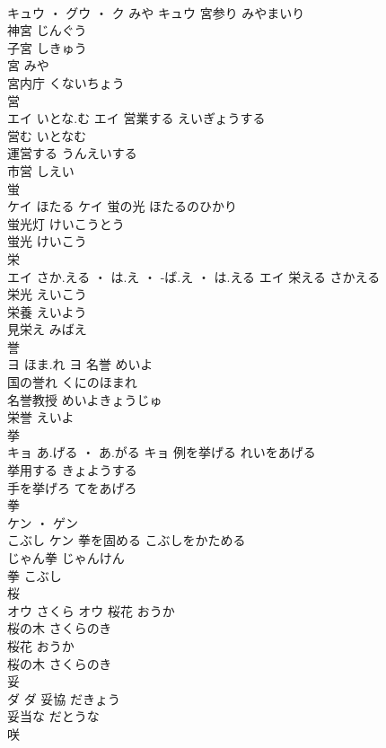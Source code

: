 \documentclass[8pt]{extreport}
\begin{document}
\begin{CJK}{UTF8}{min}
\\	キュウ ・ グウ ・ ク	みや	キュウ	宮参り	みやまいり	
\\	神宮	じんぐう	
\\	子宮	しきゅう	
\\	宮	みや	
\\	宮内庁	くないちょう	
\\	営	
\\	エイ	いとな.む	エイ	営業する	えいぎょうする	
\\	営む	いとなむ	
\\	運営する	うんえいする	
\\	市営	しえい	
\\	蛍	
\\	ケイ	ほたる	ケイ	蛍の光	ほたるのひかり	
\\	蛍光灯	けいこうとう	
\\	蛍光	けいこう	
\\	栄	
\\	エイ	さか.える ・ は.え ・ -ば.え ・ は.える	エイ	栄える	さかえる	
\\	栄光	えいこう	
\\	栄養	えいよう	
\\	見栄え	みばえ	
\\	誉	
\\	ヨ	ほま.れ	ヨ	名誉	めいよ	
\\	国の誉れ	くにのほまれ	
\\	名誉教授	めいよきょうじゅ	
\\	栄誉	えいよ	
\\	挙	
\\	キョ	あ.げる ・ あ.がる	キョ	例を挙げる	れいをあげる	
\\	挙用する	きょようする	
\\	手を挙げろ	てをあげろ	
\\	拳	
\\	ケン ・ ゲン
\\	こぶし	ケン	拳を固める	こぶしをかためる	
\\	じゃん拳	じゃんけん	
\\	拳	こぶし	
\\	桜	
\\	オウ	さくら	オウ	桜花	おうか	
\\	桜の木	さくらのき	
\\	桜花	おうか	
\\	桜の木	さくらのき	
\\	妥	
\\	ダ		ダ	妥協	だきょう	
\\	妥当な	だとうな	
\\	咲	

\end{CJK}
\end{document}
